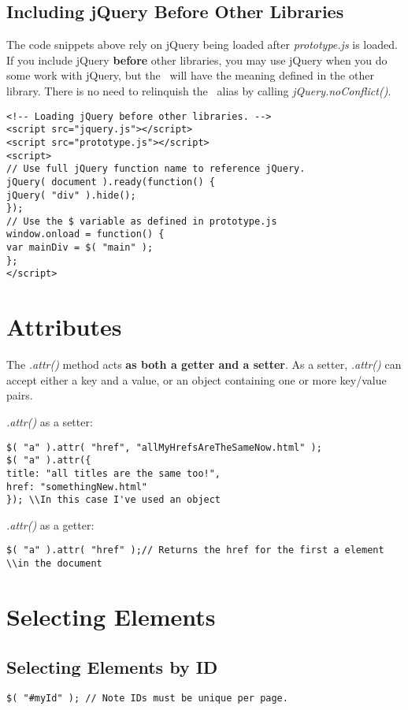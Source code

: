 \documentclass[10pt,letterpaper]{report}
\begin{document}
\subsection{Including jQuery Before Other Libraries}
The code snippets above rely on jQuery being loaded after \textit{prototype.js} is loaded. If you include jQuery \textbf{before} other libraries, you may use jQuery when you do some work with jQuery, but the \textdollar \, will have the meaning defined in the other library. There is no need to relinquish the \textdollar \, alias by calling \textit{jQuery.noConflict()}.
\begin{lstlisting}
<!-- Loading jQuery before other libraries. -->
<script src="jquery.js"></script>
<script src="prototype.js"></script>
<script>
// Use full jQuery function name to reference jQuery.
jQuery( document ).ready(function() {
jQuery( "div" ).hide();
});
// Use the $ variable as defined in prototype.js
window.onload = function() {
var mainDiv = $( "main" );
};
</script>
\end{lstlisting}
\section{Attributes}
The \textit{.attr()} method acts \textbf{as both a getter and a setter}. As a setter, \textit{.attr()} can accept either a key and a value, or an object containing one or more key/value pairs.

\textit{.attr()} as a setter:
\begin{lstlisting}
$( "a" ).attr( "href", "allMyHrefsAreTheSameNow.html" );
$( "a" ).attr({
title: "all titles are the same too!",
href: "somethingNew.html"
}); \\In this case I've used an object
\end{lstlisting}
\textit{.attr()} as a getter:
\begin{lstlisting}
$( "a" ).attr( "href" );// Returns the href for the first a element
\\in the document
\end{lstlisting}
\section{Selecting Elements}
\subsection{Selecting Elements by ID}
\begin{lstlisting}
$( "#myId" ); // Note IDs must be unique per page.
\end{lstlisting}
\end{document}
